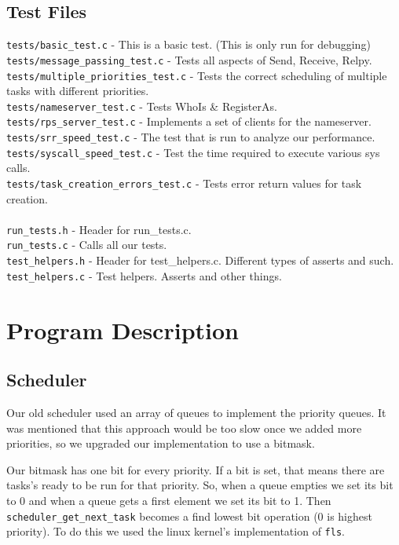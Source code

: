\documentclass[letterpaper]{article}
\begin{document}
\subsection{Test Files}
\verb!tests/basic_test.c! - This is a basic test. (This is only run for debugging)\\
\verb!tests/message_passing_test.c! - Tests all aspects of Send, Receive, Relpy.\\
\verb!tests/multiple_priorities_test.c! - Tests the correct scheduling of multiple tasks with different priorities.\\
\verb!tests/nameserver_test.c! - Tests WhoIs \& RegisterAs.\\
\verb!tests/rps_server_test.c! - Implements a set of clients for the nameserver.\\
\verb!tests/srr_speed_test.c! - The test that is run to analyze our performance.\\
\verb!tests/syscall_speed_test.c! - Test the time required to execute various sys calls.\\
\verb!tests/task_creation_errors_test.c! - Tests error return values for task creation.\\
\\
\verb!run_tests.h! - Header for run\_tests.c.\\
\verb!run_tests.c! - Calls all our tests.\\
\verb!test_helpers.h! - Header for test\_helpers.c. Different types of asserts and such.\\
\verb!test_helpers.c! - Test helpers. Asserts and other things.

\section{Program Description}

\subsection{Scheduler}

Our old scheduler used an array of queues to implement the priority queues. It was mentioned that this approach would be too slow once we added more priorities, so we upgraded our implementation to use a bitmask. 

Our bitmask has one bit for every priority. If a bit is set, that means there are tasks's ready to be run for that priority. So, when a queue empties we set its bit to 0 and when a queue gets a first element we set its bit to 1. Then {\tt scheduler\_get\_next\_task} becomes a find lowest bit operation (0 is highest priority). To do this we used the linux kernel's implementation of {\tt fls}.
\end{document}

